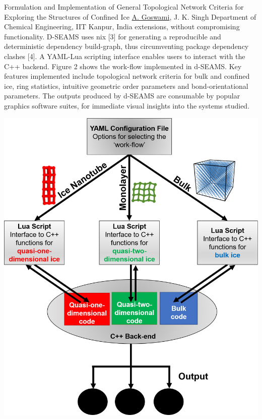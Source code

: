 \begin{abstract_online}{Formulation and Implementation of General Topological Network Criteria for Exploring the Structures of Confined Ice}{%
        \underline{A. Goswami}, J. K. Singh}{%
        }{%
        Department of Chemical Engineering, IIT Kanpur, India}
extensions, without compromising functionality. D-SEAMS uses nix [3] for generating a reproducible and deterministic dependency build-graph, thus circumventing package dependency clashes [4]. A YAML-Lua scripting interface enables users to interact with the C++ backend. Figure 2 shows the work-flow implemented in d-SEAMS. Key features implemented include topological network criteria for bulk and confined ice, ring statistics, intuitive geometric order parameters and bond-orientational parameters. The outputs produced by d-SEAMS are consumable by popular graphics software suites, for immediate visual insights into the systems studied. \begin{center}  \includegraphics[scale = 0.4]{abstracts/txt/figures/workFlowChart.jpg}  \caption{\textbf{Figure 2:} Code pipeline of d-SEAMS. The YAML script file provides options to choose the  type of the system and the corresponding work-flow, for either bulk, quasi-one-dimensional  quasi-tqo-dimensional monolayer sytems. The Lua interface functions interact with the  C++ functions for each work-flow, and functions of other work-flows are not exposed to  the user.}  \end{center} 
    

\end{abstract_online}
